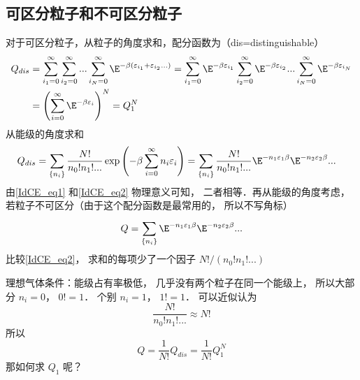 
\subsection{可区分粒子和不可区分粒子}
对于可区分粒子，从粒子的角度求和，配分函数为（dis=distinguishable）
  \begin{equation}\label{IdCE_eq1}
    \begin{aligned}
    {Q_{dis}} & = \sum\limits_{{i_1} = 0}^\infty  {\sum\limits_{{i_2} = 0}^\infty  {...\sum\limits_{{i_N} = 0}^\infty  {{\E^{ - \beta ({\varepsilon _{{i_1}}} + {\varepsilon _{{i_2}}}...)}}} } } = \sum\limits_{{i_1} = 0}^\infty  {{\E^{ - \beta {\varepsilon _{{i_1}}}}}} \sum\limits_{{i_2} = 0}^\infty  {{\E^{ - \beta {\varepsilon _{{i_2}}}}}} ...\sum\limits_{{i_N} = 0}^\infty  {{\E^{ - \beta {\varepsilon _{{i_N}}}}}} \\
      & = {\left( {\sum\limits_{i = 0}^\infty  {{\E^{ - \beta {\varepsilon _i}}}} } \right)^N}= Q_1^N
\end{aligned}
\end{equation}
从能级的角度求和
\begin{equation}\label{IdCE_eq2}
\begin{aligned}
{Q_{dis}} & = \sum\limits_{\{ {n_i}\} }^{} {\frac{{N!}}{{{n_0}!{n_1}!...}}\exp \left( { - \beta \sum\limits_{i = 0}^\infty  {{n_i}{\varepsilon _i}} } \right)} = \sum\limits_{\{ {n_i}\} }^{} {\frac{{N!}}{{{n_0}!{n_1}!...}}{\E^{ - {n_1}{\varepsilon _1}\beta }}{\E^{ - {n_2}{\varepsilon _2}\beta }}...}
\end{aligned}
\end{equation}
由\autoref{IdCE_eq1} 和\autoref{IdCE_eq2} 物理意义可知， 二者相等．再从能级的角度考虑， 若粒子不可区分（由于这个配分函数是最常用的， 所以不写角标）
\begin{equation}\label{IdCE_eq3}
Q = \sum\limits_{\{ {n_i}\} }^{} {{\E^{ - {n_1}{\varepsilon _1}\beta }}{\E^{ - {n_2}{\varepsilon _2}\beta }}...}
\end{equation}
比较\autoref{IdCE_eq2}，  求和的每项少了一个因子 ${{N!}}/({{{n_0}!{n_1}!...}})$

理想气体条件：能级占有率极低， 几乎没有两个粒子在同一个能级上， 所以大部分 ${n_i} = 0$，  $0! = 1$．  个别 ${n_i} = 1$，  $1! = 1$．
可以近似认为
\begin{equation}
\frac{{N!}}{{{n_0}!{n_1}!...}} \approx N!
\end{equation}
所以
  \begin{equation}
    Q = \frac{1}{{N!}}{Q_{dis}} = \frac{1}{{N!}}Q_1^N
  \end{equation}
  那如何求 $Q_1$ 呢？ 

